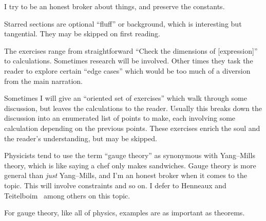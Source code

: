I try to be an honest broker about things, and preserve the constants.

Starred sections are optional ``fluff'' or background, which is
interesting but tangential. They may be skipped on first reading.

The exercises range from straightforward ``Check the dimensions of
[expression]'' to calculations. Sometimes research will be involved.
Other times they task the reader to explore certain ``edge cases''
which would be too much of a diversion from the main narration.

Sometimes I will give an ``oriented set of exercises'' which walk
through some discussion, but leaves the calculations to the
reader. Usually this breaks down the discussion into an enumerated list
of points to make, each involving some calculation depending on the
previous points. These exercises enrich the soul and the reader's
understanding, but may be skipped.

Physicists tend to use the term ``gauge theory'' as synonymous with
Yang--Mills theory, which is like saying a chef only makes sandwiches.
Gauge theory is more general than \emph{just} Yang--Mills, and I'm an
honest broker when it comes to the topic. This will involve constraints
and so on. I defer to Henneaux and Teitelboim~\cite{Henneaux:1992ig}
among others on this topic.

For gauge theory, like all of physics, examples are as important as
theorems. 
